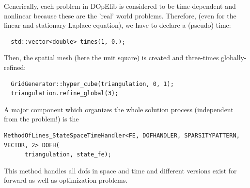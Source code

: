 \documentclass[prodmode,acmtoms]{acmsmall}
\numberwithin{equation}{section}
\begin{document}
Generically, each problem in DOpElib is considered to be time-dependent and nonlinear because
these are the 'real' world problems. Therefore, (even for the linear and stationary Laplace equation),
we have to declare a (pseudo) time:
\begin{lstlisting}
  std::vector<double> times(1, 0.);
\end{lstlisting}
Then, the spatial mesh (here the unit square) is created and three-times globally-refined:
\begin{lstlisting}
  GridGenerator::hyper_cube(triangulation, 0, 1);
  triangulation.refine_global(3);
\end{lstlisting}
A major component which organizes the whole solution process (independent from 
the problem!) is the 
\begin{lstlisting}
MethodOfLines_StateSpaceTimeHandler<FE, DOFHANDLER, SPARSITYPATTERN, VECTOR, 2> DOFH(
      triangulation, state_fe);
\end{lstlisting}
This method handles all dofs in space and time and different versions exist
for forward as well as optimization problems.
\end{document}
